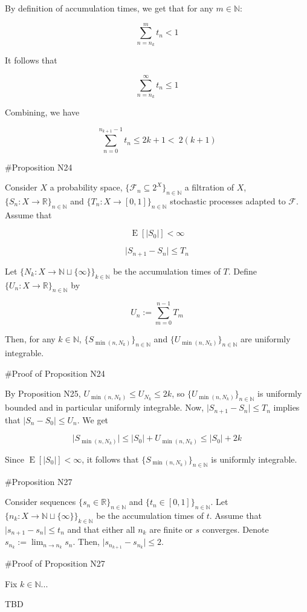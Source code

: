\documentclass[a4paper]{article}
\DeclareMathOperator{\E}{E}
\newcommand{\Nats}{\mathbb{N}}
\newcommand{\Reals}{\mathbb{R}}
\newcommand{\Sq}[2]{\{#1\}_{#2 \in \Nats}}
\newcommand{\Sqn}[1]{\Sq{#1}{n}}
\newcommand{\Abs}[1]{\lvert #1 \rvert}
\newcommand{\F}{\mathcal{F}}
\begin{document}
By definition of accumulation times, we get that for any ${m \in \Nats}$:

$$\sum_{n = n_k}^{m} t_n < 1$$

It follows that

$$\sum_{n = n_k}^{\infty} t_n \leq 1$$

Combining, we have

$$\sum_{n = 0}^{n_{k+1} - 1} t_n \leq 2k+1 <\ 2(k+1)$$

\#Proposition N24

Consider ${X}$ a probability space, ${\{\F_n \subseteq 2^X\}_{n \in \Nats}}$ a filtration of ${X}$, ${\{S_n:X \rightarrow \Reals\}_{n \in \Nats}}$ and ${\{T_n:X \rightarrow [0,1]\}_{n \in \Nats}}$ stochastic processes adapted to ${\F}$. Assume that

$$\E[\Abs{S_0}] < \infty$$

$$\Abs{S_{n+1}-S_n} \leq T_n$$

Let ${\{N_k: X \rightarrow \Nats \sqcup \{\infty\}\}_{k \in \Nats}}$ be the accumulation times of ${T}$. Define ${\Sqn{U_n: X \rightarrow \Reals}}$ by

$$U_n := \sum_{m=0}^{n-1} T_m$$

Then, for any ${k \in \Nats}$, ${\Sqn{S_{\min(n,N_k)}}}$ and ${\Sqn{U_{\min(n,N_k)}}}$ are uniformly integrable.

\#Proof of Proposition N24

By Proposition N25, $U_{\min(n,N_k)} \leq U_{N_k} \leq 2k$, so ${\Sqn{U_{\min(n,N_k)}}}$ is uniformly bounded and in particular uniformly integrable. Now, $\Abs{S_{n+1}-S_n} \leq T_n$ implies that ${\Abs{S_{n}-S_0} \leq U_n}$. We get

$$\Abs{S_{\min(n,N_k)}} \leq \Abs{S_0} + U_{\min(n,N_k)} \leq \Abs{S_0} + 2k$$

Since ${\E[\Abs{S_0}] < \infty}$, it follows that ${\Sqn{S_{\min(n,N_k)}}}$ is uniformly integrable.

\#Proposition N27

Consider sequences ${\Sqn{s_n \in \Reals}}$ and ${\Sqn{t_n \in [0,1]}}$. Let ${\{n_k: X \rightarrow \Nats \sqcup \{\infty\}\}_{k \in \Nats}}$ be the accumulation times of ${t}$. Assume that ${\Abs{s_{n+1} - s_n} \leq t_n}$ and that either all ${n_{k}}$ are finite or $s$ converges. Denote $s_{n_k}:=\lim_{n \rightarrow n_k} s_n$. Then, ${\Abs{s_{n_{k+1}}-s_{n_k}} \leq 2}$.

\#Proof of Proposition N27

Fix ${k \in \Nats}$...

TBD
\end{document}
